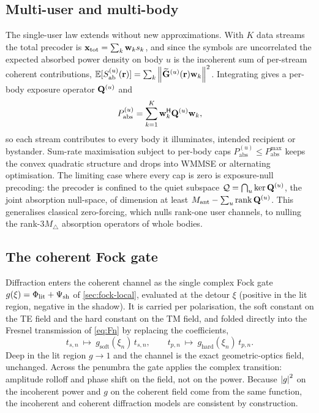 \subsection{Multi-user and multi-body}

The single-user law extends without new approximations. With $K$ data
streams the total precoder is $\mathbf{x}_{\mathrm{tot}}=\sum_k\mathbf w_k s_k$,
and since the symbols are uncorrelated the expected absorbed power
density on body $u$ is the incoherent sum of per-stream coherent
contributions,
$\mathbb E[S_{\mathrm{ab}}^{(u)}(\mathbf{r})]=\sum_k\norm{\widetilde{\mathbf{G}}^{(u)}(\mathbf{r})\mathbf w_k}^2$.
Integrating gives a per-body exposure operator $\mathbf{Q}^{(u)}$ and
\begin{equation}\label{eq:MU}
  P_{\mathrm{abs}}^{(u)}=\sum_{k=1}^K\mathbf w_k^{\mathsf{H}}\mathbf{Q}^{(u)}\mathbf w_k,
\end{equation}
so each stream contributes to every body it illuminates, intended
recipient or bystander. Sum-rate maximisation subject to per-body caps
$P_{\mathrm{abs}}^{(u)}\le P_{\mathrm{abs}}^{\max}$ keeps the convex
quadratic structure and drops into WMMSE or alternating optimisation.
The limiting case where every cap is zero is exposure-null precoding:
the precoder is confined to the quiet subspace
$\mathcal Q=\bigcap_u\ker\mathbf{Q}^{(u)}$, the joint absorption null-space,
of dimension at least $M_{\mathrm{ant}}-\sum_u\operatorname{rank}\mathbf{Q}^{(u)}$.
This generalises classical zero-forcing, which nulls rank-one user
channels, to nulling the rank-$3M_\triangle$ absorption operators of
whole bodies.

\subsection{The coherent Fock gate}

Diffraction enters the coherent channel as the single complex Fock gate
$g(\xi)=\Phi_{\mathrm{lit}}+\Psi_{\mathrm{sh}}$ of \cref{sec:fock-local}, evaluated at the
detour $\xi$ (positive in the lit region, negative in the shadow). It is
carried per polarisation, the soft constant on the TE field and the hard
constant on the TM field, and folded directly into the Fresnel
transmission of \cref{eq:Fn} by replacing the coefficients,
\begin{equation}\label{eq:gated-fresnel}
  t_{s,n}\ \longmapsto\ g_{\mathrm{soft}}(\xi_n)\,t_{s,n},
  \qquad
  t_{p,n}\ \longmapsto\ g_{\mathrm{hard}}(\xi_n)\,t_{p,n}.
\end{equation}
Deep in the lit region $g\to 1$ and the channel is the exact
geometric-optics field, unchanged. Across the penumbra the gate applies
the complex transition: amplitude rolloff and phase shift on the
field, not on the power. Because $\abs{g}^2$ on the incoherent power and
$g$ on the coherent field come from the same function, the incoherent
and coherent diffraction models are consistent by construction.

